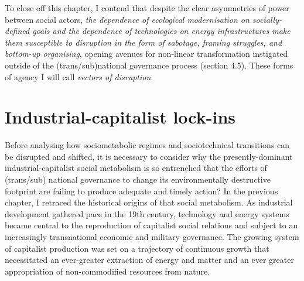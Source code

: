 \documentclass[a4paper, nobind]{templates/ociamthesis}
\begin{document}
To close off this chapter, I contend that despite the clear asymmetries of power between social actors, \emph{the dependence of ecological modernisation on socially-defined goals and the dependence of technologies on energy infrastructures make them susceptible to disruption in the form of sabotage, framing struggles, and bottom-up organising}, opening avenues for non-linear transformation instigated outside of the (trans/sub)national governance process (section 4.5). These forms of agency I will call \emph{vectors of disruption}.

\hypertarget{industrial-capitalist-lock-ins}{%
\section{Industrial-capitalist lock-ins}\label{industrial-capitalist-lock-ins}}

Before analysing how sociometabolic regimes and sociotechnical transitions can be disrupted and shifted, it is necessary to consider why the presently-dominant industrial-capitalist social metabolism is so entrenched that the efforts of (trans/sub) national governance to change its environmentally destructive footprint are failing to produce adequate and timely action? In the previous chapter, I retraced the historical origins of that social metabolism. As industrial development gathered pace in the 19th century, technology and energy systems became central to the reproduction of capitalist social relations and subject to an increasingly transnational economic and military governance. The growing system of capitalist production was set on a trajectory of continuous growth that necessitated an ever-greater extraction of energy and matter and an ever greater appropriation of non-commodified resources from nature.
\end{document}
